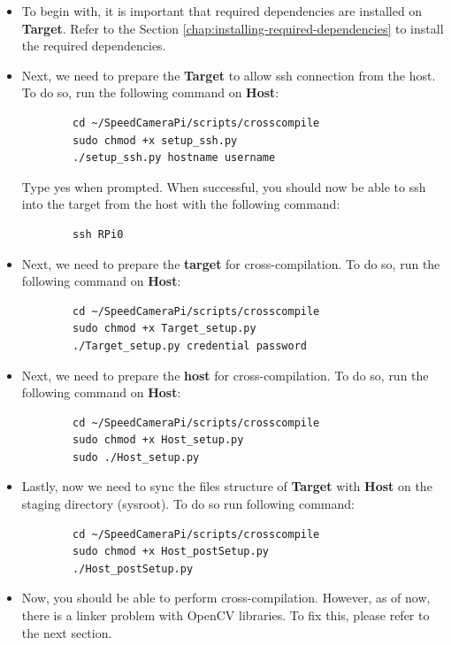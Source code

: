 \begin{itemize}
      \item To begin with, it is important that required dependencies are installed on \textbf{Target}. Refer to the Section \ref{chap:installing-required-dependencies} to install the required dependencies.

      \item Next, we need to prepare the \textbf{Target} to allow ssh connection from the host. To do so, run the following command on \textbf{Host}:

            \begin{lstlisting}
        cd ~/SpeedCameraPi/scripts/crosscompile
        sudo chmod +x setup_ssh.py
        ./setup_ssh.py hostname username
    \end{lstlisting}

            Type yes when prompted. When successful, you should now be able to ssh into
            the target from the host with the following command:

            \begin{lstlisting}
        ssh RPi0
    \end{lstlisting}

      \item Next, we need to prepare the \textbf{target} for cross-compilation. To do so, run the following command on \textbf{Host}:

            \begin{lstlisting}
        cd ~/SpeedCameraPi/scripts/crosscompile
        sudo chmod +x Target_setup.py
        ./Target_setup.py credential password
    \end{lstlisting}

      \item Next, we need to prepare the \textbf{host} for cross-compilation. To do so, run the following command on \textbf{Host}:

            \begin{lstlisting}
        cd ~/SpeedCameraPi/scripts/crosscompile
        sudo chmod +x Host_setup.py
        sudo ./Host_setup.py
    \end{lstlisting}

      \item Lastly, now we need to sync the files structure of \textbf{Target} with \textbf{Host} on the staging directory (sysroot). To do so run following command:

            \begin{lstlisting}
        cd ~/SpeedCameraPi/scripts/crosscompile
        sudo chmod +x Host_postSetup.py
        ./Host_postSetup.py
    \end{lstlisting}

      \item Now, you should be able to perform cross-compilation. However, as of now, there is a linker problem with OpenCV libraries. To fix this, please refer to the next section.
\end{itemize}

